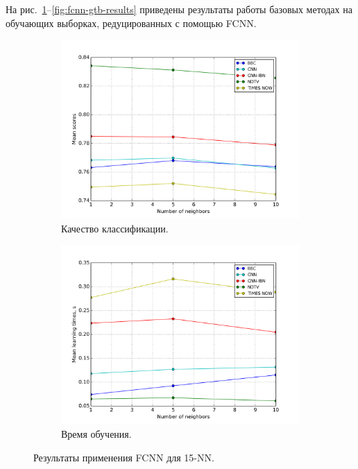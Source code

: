 На рис.~\ref{fig:fcnn-knn-results}--\ref{fig:fcnn-gtb-results} приведены результаты работы базовых методах на обучающих выборках, редуцированных с помощью FCNN. 

\begin{figure}[h!]
    \centering
	\begin{subfigure}{0.45\textwidth}
		\includegraphics[width=\textwidth]{images/fcnn-KNN.png}
		\caption{Качество классификации.}
	\end{subfigure}
	\begin{subfigure}{0.45\textwidth}
		\includegraphics[width=\textwidth]{images/fcnn-KNNTime.png}
		\caption{Время обучения.}
	\end{subfigure}
	\caption{Результаты применения FCNN для 15-NN.}\label{fig:fcnn-knn-results}
\end{figure}

